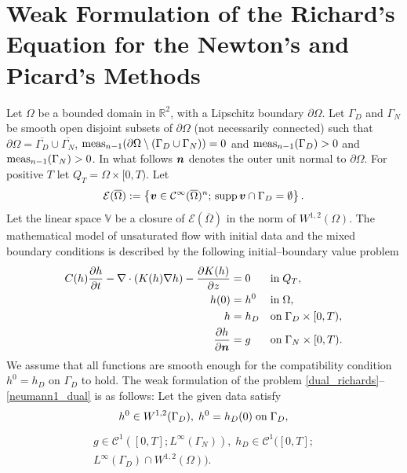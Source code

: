 \documentclass[final,3p,times,twocolumn]{elsarticle}
\newcommand{\bfv}{\mbox{\boldmath $v$}}
\newcommand{\bfn}{\mbox{\boldmath $n$}}
\newcommand{\om}{\Omega}
\begin{document}
\appendix


\section{Weak Formulation of the Richard's Equation
for the Newton's and Picard's Methods}\label{sec:9}

Let $\Omega$ be a bounded domain in $\mathbb{R}^2$,
with a Lipschitz boundary $\partial\Omega$. Let
$\Gamma_D$ and $\Gamma_N$ be smooth open disjoint subsets of
$\partial\Omega$ (not necessarily connected) such that
$\partial\Omega = \overline{\Gamma_D}\cup\overline{\Gamma_N}$,
$\textmd{meas}_{n-1}(\partial\Omega\setminus({\Gamma_D}\cup{\Gamma_N}
))=0$ and $\textmd{meas}_{n-1}(\Gamma_D)>0$ and
$\textmd{meas}_{n-1}(\Gamma_N)>0$. In what follows $\bfn$ denotes the outer unit
normal to $\partial\Omega$. For positive $T$ let
$Q_T=\Omega\times[0,T)$.
Let
\begin{displaymath}
{\mathcal{E}}(\overline{\Omega}):=\left\{\bfv\in{\mathcal
C}^\infty(\overline{\Omega})^n; \, {\textmd{supp}\, \bfv}  \cap
\Gamma_D = \emptyset \right\}.
\end{displaymath}
Let the linear space $\mathbb{V}$ be a closure of
${\mathcal{E}}(\overline{\Omega})$ in the norm of $W^{1,2}(\om)$.
The mathematical model of unsaturated flow with initial data and the
mixed boundary conditions is described by the following
initial--boundary value problem
\begin{align}
 C(h)\frac{\partial h}{\partial t}
 - \nabla \cdot \left( K(h) \nabla h \right)
  -  \frac{\partial K(h)}{\partial z}
  &= 0  &&\textmd{in}\; Q_T,
\label{dual_richards}
\\
h(0) &= h^0 &&\textmd{in}\;\Omega, \label{dual_richards_init}
\\
h &= h_D  &&\textmd{on}\;\Gamma_D \times
[0,T),\label{dirichlet_dual}
\\
\frac{\partial h}{\partial \bfn} &= g &&\textmd{on}\;\Gamma_N \times
[0,T). \label{neumann1_dual}
\end{align}
We assume that all functions are smooth enough for the 
compatibility condition $h^0=h_D$ on $\Gamma_D$ to hold.
The weak formulation of the problem
\eqref{dual_richards}--\eqref{neumann1_dual} is as follows:
Let the given data satisfy
\begin{equation}
h^0 \in W^{1,2}(\Gamma_D),  \; h^0 = h_D(0) \; \textmd{on}\;\Gamma_D,
\end{equation}
\begin{equation}
\begin{split}
g \in \mathcal{C}^1([0,T];L^{\infty}(\Gamma_N)),  \; h_D \in
\mathcal{C}^1([0,T];  \\ L^{\infty}(\Gamma_D)\cap W^{1,2}(\Omega)).
\end{split}
\end{equation}
\end{document}
